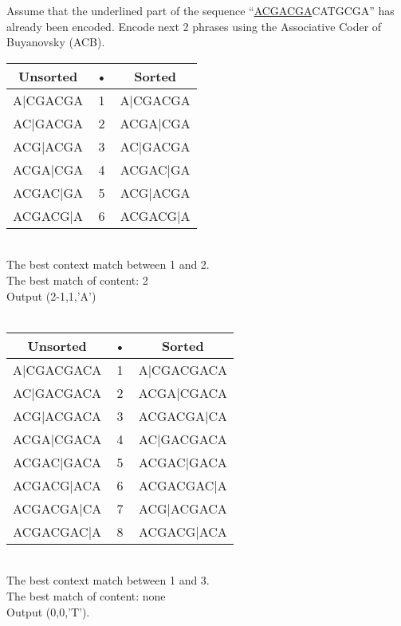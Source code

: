 \begin{question}
Assume that the underlined part of the sequence “\underline{ACGACGA}CATGCGA” has already been encoded. Encode next 2 phrases using the Associative Coder of Buyanovsky (ACB).
\end{question}
\begin{solution}
\begin{tabular}{|c|c|c|}
\hline 
Unsorted & • & Sorted \\ 
\hline 
A|CGACGA & 1 & A|CGACGA \\ 
\hline 
AC|GACGA & 2 & ACGA|CGA \\ 
\hline 
ACG|ACGA & 3 & AC|GACGA \\ 
\hline 
ACGA|CGA & 4 & ACGAC|GA \\ 
\hline 
ACGAC|GA & 5 & ACG|ACGA \\ 
\hline 
ACGACG|A & 6 & ACGACG|A \\ 
\hline 
\end{tabular} \\
The best context match between 1 and 2. \\
The best match of content: 2 \\
Output (2-1,1,’A’) \\ \\
\begin{tabular}{|c|c|c|}
\hline 
Unsorted & • & Sorted \\ 
\hline 
A|CGACGACA & 1 & A|CGACGACA \\ 
\hline 
AC|GACGACA & 2 & ACGA|CGACA \\ 
\hline 
ACG|ACGACA & 3 & ACGACGA|CA \\ 
\hline 
ACGA|CGACA & 4 & AC|GACGACA \\ 
\hline 
ACGAC|GACA & 5 & ACGAC|GACA \\ 
\hline 
ACGACG|ACA & 6 & ACGACGAC|A \\ 
\hline 
ACGACGA|CA & 7 & ACG|ACGACA \\ 
\hline 
ACGACGAC|A & 8 & ACGACG|ACA \\ 
\hline 
\end{tabular} \\
The best context match between 1 and 3. \\
The best match of content: none \\
Output (0,0,’T’).

\end{solution}

